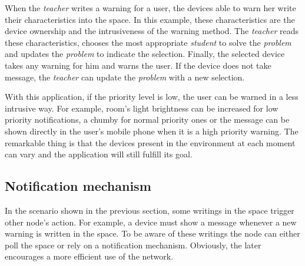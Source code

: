 When the \emph{teacher} writes a warning for a user, the devices able to warn her write their characteristics into the space.
In this example, these characteristics are the device ownership and the intrusiveness of the warning method.
The \emph{teacher} reads these characteristics, chooses the most appropriate \emph{student} to solve the \emph{problem} and updates the \emph{problem} to indicate the selection.
Finally, the selected device takes any warning for him and warns the user. %
If the device does not take message, the \emph{teacher} can update the \emph{problem} with a new selection.


With this application, if the priority level is low, the user can be warned in a less intrusive way.
For example, room's light brightness can be increased for low priority notifications, a chumby for normal priority ones or the message can be shown directly in the user's mobile phone when it is a high priority warning.
The remarkable thing is that the devices present in the environment at each moment can vary and the application will still fulfill its goal.





\subsection{Notification mechanism}
\label{sec:notification}


In the scenario shown in the previous section, some writings in the space trigger other node's action.
For example, a device must show a message whenever a new warning is written in the space. %
To be aware of these writings the node can either poll the space or rely on a notification mechanism. %
Obviously, the later encourages a more efficient use of the network. %


